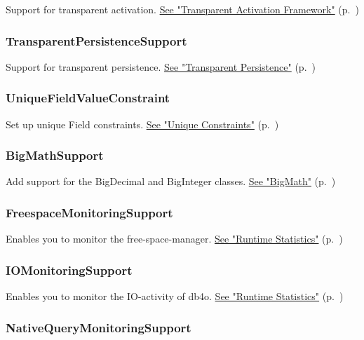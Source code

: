 Support for transparent activation. \hyperref[ref:basics-activation-concept-transparent-activation-framework]{See "Transparent Activation Framework"} (p.~\pageref{ref:basics-activation-concept-transparent-activation-framework})

\subsubsection*{TransparentPersistenceSupport}

Support for transparent persistence. \hyperref[ref:basics-update-concept-transparent-persistence]{See "Transparent Persistence"} (p.~\pageref{ref:basics-update-concept-transparent-persistence})

\subsubsection*{UniqueFieldValueConstraint}

Set up unique Field constraints. \hyperref[ref:advanced-topics-unique-constraints]{See "Unique Constraints"} (p.~\pageref{ref:advanced-topics-unique-constraints})

\subsubsection*{BigMathSupport}

Add support for the BigDecimal and BigInteger classes. \hyperref[ref:advanced-topics-type-handling-bigmath]{See "BigMath"} (p.~\pageref{ref:advanced-topics-type-handling-bigmath})

\subsubsection*{FreespaceMonitoringSupport}

Enables you to monitor the free-space-manager. \hyperref[ref:advanced-topics-runtime-statistics]{See "Runtime Statistics"} (p.~\pageref{ref:advanced-topics-runtime-statistics})

\subsubsection*{IOMonitoringSupport}

Enables you to monitor the IO-activity of db4o. \hyperref[ref:advanced-topics-runtime-statistics]{See "Runtime Statistics"} (p.~\pageref{ref:advanced-topics-runtime-statistics})

\subsubsection*{NativeQueryMonitoringSupport}

